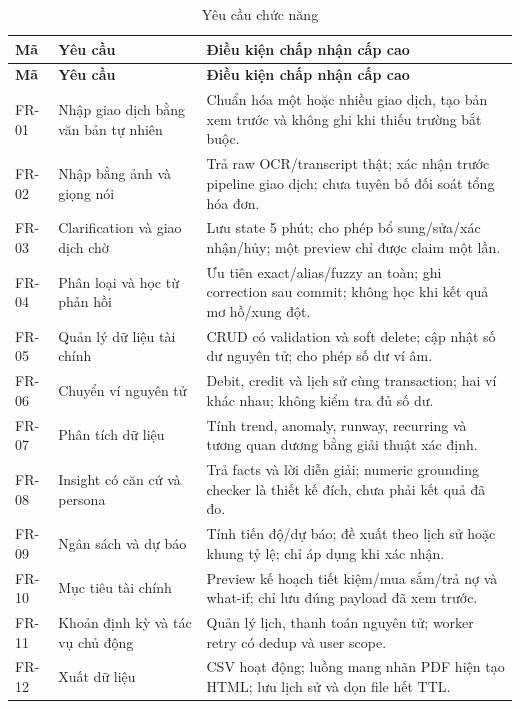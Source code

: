 \begin{longtable}{@{}L{1.3cm}L{4.3cm}L{8.2cm}@{}}
  \caption{Yêu cầu chức năng}\label{tab:functional-requirements}\\
  \toprule
  \textbf{Mã} & \textbf{Yêu cầu} & \textbf{Điều kiện chấp nhận cấp cao} \\
  \midrule
  \endfirsthead
  \toprule
  \textbf{Mã} & \textbf{Yêu cầu} & \textbf{Điều kiện chấp nhận cấp cao} \\
  \midrule
  \endhead
  FR-01 & Nhập giao dịch bằng văn bản tự nhiên & Chuẩn hóa một hoặc nhiều giao dịch, tạo bản xem trước và không ghi khi thiếu trường bắt buộc. \\
  FR-02 & Nhập bằng ảnh và giọng nói & Trả raw OCR/transcript thật; xác nhận trước pipeline giao dịch; chưa tuyên bố đối soát tổng hóa đơn. \\
  FR-03 & Clarification và giao dịch chờ & Lưu state 5 phút; cho phép bổ sung/sửa/xác nhận/hủy; một preview chỉ được claim một lần. \\
  FR-04 & Phân loại và học từ phản hồi & Ưu tiên exact/alias/fuzzy an toàn; ghi correction sau commit; không học khi kết quả mơ hồ/xung đột. \\
  FR-05 & Quản lý dữ liệu tài chính & CRUD có validation và soft delete; cập nhật số dư nguyên tử; cho phép số dư ví âm. \\
  FR-06 & Chuyển ví nguyên tử & Debit, credit và lịch sử cùng transaction; hai ví khác nhau; không kiểm tra đủ số dư. \\
  FR-07 & Phân tích dữ liệu & Tính trend, anomaly, runway, recurring và tương quan dương bằng giải thuật xác định. \\
  FR-08 & Insight có căn cứ và persona & Trả facts và lời diễn giải; numeric grounding checker là thiết kế đích, chưa phải kết quả đã đo. \\
  FR-09 & Ngân sách và dự báo & Tính tiến độ/dự báo; đề xuất theo lịch sử hoặc khung tỷ lệ; chỉ áp dụng khi xác nhận. \\
  FR-10 & Mục tiêu tài chính & Preview kế hoạch tiết kiệm/mua sắm/trả nợ và what-if; chỉ lưu đúng payload đã xem trước. \\
  FR-11 & Khoản định kỳ và tác vụ chủ động & Quản lý lịch, thanh toán nguyên tử; worker retry có dedup và user scope. \\
  FR-12 & Xuất dữ liệu & CSV hoạt động; luồng mang nhãn PDF hiện tạo HTML; lưu lịch sử và dọn file hết TTL. \\
  \bottomrule
\end{longtable}

